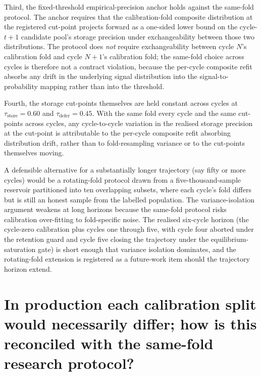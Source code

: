 Third, the fixed-threshold empirical-precision anchor holds against the same-fold protocol. The anchor requires that the calibration-fold composite distribution at the registered cut-point projects forward as a one-sided lower bound on the cycle-$t+1$ candidate pool's storage precision under exchangeability between those two distributions. The protocol does \emph{not} require exchangeability between cycle $N$'s calibration fold and cycle $N+1$'s calibration fold; the same-fold choice across cycles is therefore not a contract violation, because the per-cycle composite refit absorbs any drift in the underlying signal distribution into the signal-to-probability mapping rather than into the threshold.

Fourth, the storage cut-points themselves are held constant across cycles at $\tau_{\text{store}} = 0.60$ and $\tau_{\text{defer}} = 0.45$. With the same fold every cycle and the same cut-points across cycles, any cycle-to-cycle variation in the realised storage precision at the cut-point is attributable to the per-cycle composite refit absorbing distribution drift, rather than to fold-resampling variance or to the cut-points themselves moving.

A defensible alternative for a substantially longer trajectory (say fifty or more cycles) would be a rotating-fold protocol drawn from a five-thousand-sample reservoir partitioned into ten overlapping subsets, where each cycle's fold differs but is still an honest sample from the labelled population. The variance-isolation argument weakens at long horizons because the same-fold protocol risks calibration over-fitting to fold-specific noise. The realised six-cycle horizon (the cycle-zero calibration plus cycles one through five, with cycle four aborted under the retention guard and cycle five closing the trajectory under the equilibrium-saturation gate) is short enough that variance isolation dominates, and the rotating-fold extension is registered as a future-work item should the trajectory horizon extend.


\section[Production vs research fold]{In production each calibration split would necessarily differ; how is this reconciled with the same-fold research protocol?}
\label{app:qa-production-fold}


